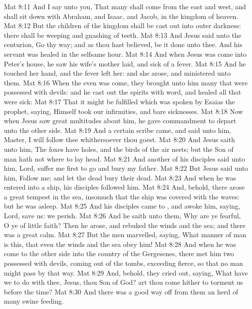 \vs Mat 8:11 And I say unto you, That many shall come from the east and west, and shall sit down with Abraham, and Isaac, and Jacob, in the kingdom of heaven.
\vs Mat 8:12 But the children of the kingdom shall be cast out into outer darkness: there shall be weeping and gnashing of teeth.
\vs Mat 8:13 And Jesus said unto the centurion, Go thy way; and as thou hast believed,  be it done unto thee. And his servant was healed in the selfsame hour.
\vs Mat 8:14 And when Jesus was come into Peter's house, he saw his wife's mother laid, and sick of a fever.
\vs Mat 8:15 And he touched her hand, and the fever left her: and she arose, and ministered unto them.
\vs Mat 8:16 When the even was come, they brought unto him many that were possessed with devils: and he cast out the spirits with  word, and healed all that were sick:
\vs Mat 8:17 That it might be fulfilled which was spoken by Esaias the prophet, saying, Himself took our infirmities, and bare  sicknesses.
\vs Mat 8:18 Now when Jesus saw great multitudes about him, he gave commandment to depart unto the other side.
\vs Mat 8:19 And a certain scribe came, and said unto him, Master, I will follow thee whithersoever thou goest.
\vs Mat 8:20 And Jesus saith unto him, The foxes have holes, and the birds of the air  nests; but the Son of man hath not where to lay  head.
\vs Mat 8:21 And another of his disciples said unto him, Lord, suffer me first to go and bury my father.
\vs Mat 8:22 But Jesus said unto him, Follow me; and let the dead bury their dead.
\vs Mat 8:23 And when he was entered into a ship, his disciples followed him.
\vs Mat 8:24 And, behold, there arose a great tempest in the sea, insomuch that the ship was covered with the waves: but he was asleep.
\vs Mat 8:25 And his disciples came to , and awoke him, saying, Lord, save us: we perish.
\vs Mat 8:26 And he saith unto them, Why are ye fearful, O ye of little faith? Then he arose, and rebuked the winds and the sea; and there was a great calm.
\vs Mat 8:27 But the men marvelled, saying, What manner of man is this, that even the winds and the sea obey him!
\vs Mat 8:28 And when he was come to the other side into the country of the Gergesenes, there met him two possessed with devils, coming out of the tombs, exceeding fierce, so that no man might pass by that way.
\vs Mat 8:29 And, behold, they cried out, saying, What have we to do with thee, Jesus, thou Son of God? art thou come hither to torment us before the time?
\vs Mat 8:30 And there was a good way off from them an herd of many swine feeding.
